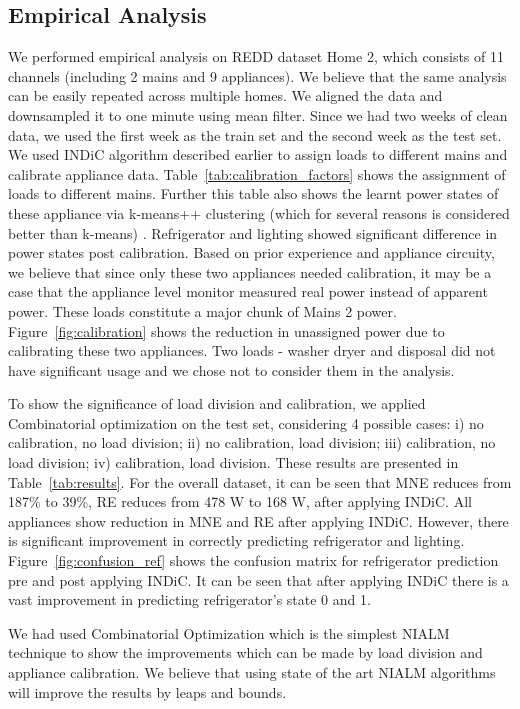\documentclass[conference]{IEEEtran}
\newcommand{\figref}[1]{Figure~\ref{#1}}
\newcommand{\tabref}[1]{Table~\ref{#1}}
\begin{document}
\subsection{Empirical Analysis}
We performed empirical analysis on REDD dataset Home 2, which consists of 11 channels (including 2 mains and 9 appliances). We believe that the same analysis can be easily repeated across multiple homes. We aligned the data and downsampled it to one minute using mean filter. Since we had two weeks of clean data, we used the first week as the train set and the second week as the test set. We used INDiC algorithm described earlier to assign loads to different mains and calibrate appliance data. \tabref{tab:calibration_factors} shows the assignment of loads to different mains. Further this table also shows the learnt power states of these appliance via k-means++ clustering (which for several reasons is considered better than k-means) \cite{kmeansplusplus}. Refrigerator and lighting showed significant difference in power states post calibration. Based on prior experience and appliance circuity, we believe that since only these two appliances needed calibration, it may be a case that the appliance level monitor measured real power instead of apparent power. These loads constitute a major chunk of Mains 2 power. \figref{fig:calibration} shows the reduction in unassigned power due to calibrating these two appliances. Two loads - washer dryer and disposal did not have significant usage and we chose not to consider them in the analysis. 

To show the significance of load division and calibration, we applied Combinatorial optimization on the test set, considering 4 possible cases:  i) no calibration, no load division; ii) no calibration, load division; iii) calibration, no load division; iv) calibration, load division. These results are presented in \tabref{tab:results}. For the overall dataset, it can be seen that MNE reduces from 187\% to 39\%, RE reduces from 478 W to 168 W, after applying INDiC. All appliances show reduction in MNE and RE after applying INDiC. However, there is significant improvement in correctly predicting refrigerator and lighting. \figref{fig:confusion_ref} shows the confusion matrix for refrigerator prediction pre and post applying INDiC. It can be seen that after applying INDiC there is a vast improvement in predicting refrigerator's state 0 and 1.

We had used Combinatorial Optimization which is the simplest NIALM technique to show the improvements which can be made by load division and appliance calibration. We believe that using state of the art NIALM algorithms will improve the results by leaps and bounds.
\end{document}
